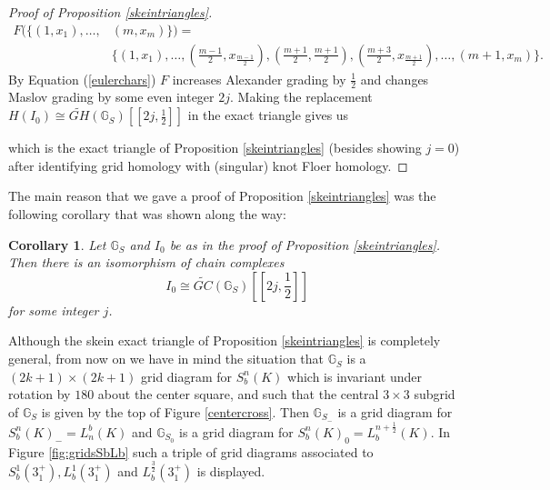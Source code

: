 \documentclass[11pt]{amsart}
\newtheorem{corollary}[theorem]{Corollary}
\theoremstyle{definition}
\theoremstyle{remark}
\numberwithin{equation}{section}
\begin{document}
\begin{proof}[Proof of Proposition \ref{skeintriangles}]
\begin{equation*}
\begin{split}
F(\{(1,x_1), \hdots,& (m,x_m)\})= \\
& \{(1,x_1),\hdots,(\frac{m-1}{2}, x_{\frac{m-1}{2}}), (\frac{m+1}{2}, \frac{m+1}{2}), (\frac{m+3}{2}, x_{\frac{m+1}{2}}), \hdots,(m+1, x_m)\}.
\end{split}
\end{equation*}
By Equation (\ref{eulerchars}) $F$ increases Alexander grading by $\frac{1}{2}$ and changes Maslov grading by some even integer $2j$. Making the replacement $H(I_0)\cong \widetilde{GH}(\mathbb{G}_S)[[2j,\frac{1}{2}]]$ in the exact triangle  gives us
\begin{center}
\end{center}
which is the exact triangle of Proposition \ref{skeintriangles} (besides showing $j=0$) after identifying grid homology with (singular) knot Floer homology.

\end{proof}

The main reason that we gave a proof of Proposition \ref{skeintriangles} was the following corollary that was shown along the way:
\begin{corollary}\label{gradingshift}
    Let $\mathbb{G}_S$ and $I_0$ be as in the proof of Proposition \ref{skeintriangles}. Then there is an isomorphism of chain complexes
    \begin{equation}
    I_0\cong \widetilde{GC}(\mathbb{G}_S)[[2j,\frac{1}{2}]]
    \end{equation}
    for some integer $j$.
\end{corollary}

Although the skein exact triangle of Proposition \ref{skeintriangles} is completely general, from now on we have in mind the situation that $\mathbb{G}_S$ is a $(2k+1)\times (2k+1)$ grid diagram for $S^n_b(K)$ which is invariant under rotation by $180$ about the center square, and such that the central $3\times3$ subgrid of $\mathbb{G}_S$ is given by the top of Figure \ref{centercross}. Then $\mathbb{G}_{S_-}$ is a grid diagram for $S^n_b(K)_-=L^b_n(K)$ and $\mathbb{G}_{S_0}$ is a grid diagram for $S^n_b(K)_0=L_b^{n+\frac{1}{2}}(K)$. In Figure \ref{fig:gridsSbLb} such a triple of grid diagrams associated to $S^1_b(3_1^+), L^1_b(3_1^+)$ and $L^{\frac{3}{2}}_b(3_1^+)$ is displayed.
\end{document}
